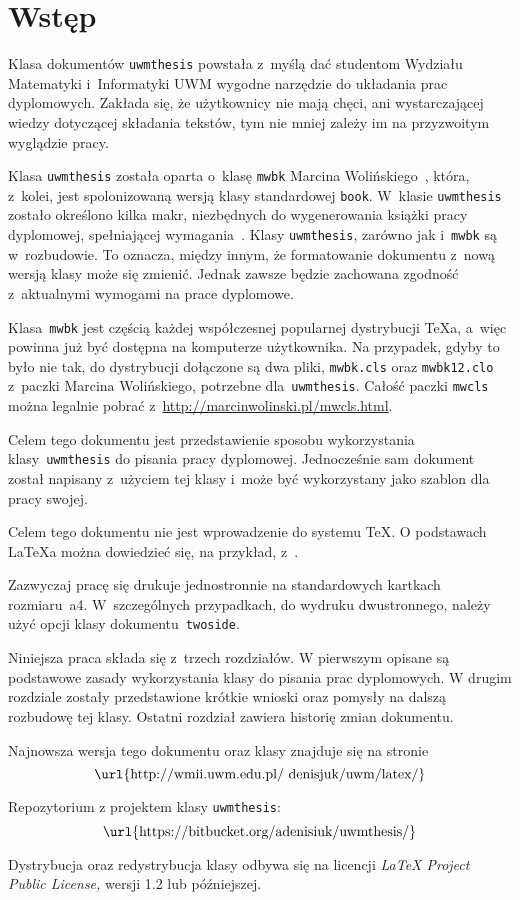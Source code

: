 
\chapter*{Wstęp}

Klasa dokumentów \texttt{uwmthesis} powstała z~myślą dać studentom Wydziału Matematyki i~Informatyki UWM wygodne narzędzie do układania prac dyplomowych. Zakłada się, że użytkownicy nie mają chęci, ani wystarczającej wiedzy dotyczącej składania tekstów, tym nie mniej zależy im na przyzwoitym wyglądzie pracy.


Klasa \texttt{uwmthesis} została oparta o~klasę \texttt{mwbk} Marcina Wolińskiego~\cite{Wolinski}, która, z~kolei, jest spolonizowaną wersją klasy standardowej \texttt{book}. W~klasie \texttt{uwmthesis} zostało określono kilka makr, niezbędnych do wygenerowania książki pracy dyplomowej, spełniającej wymagania~\cite{UWM}. Klasy \texttt{uwmthesis}, zarówno jak i~\texttt{mwbk} są w~rozbudowie. To oznacza, między innym, że formatowanie dokumentu z~nową wersją klasy może się zmienić. Jednak zawsze będzie zachowana zgodność z~aktualnymi wymogami na prace dyplomowe.

Klasa~\texttt{mwbk} jest częścią każdej współczesnej popularnej dystrybucji \TeX a, a~więc powinna już być dostępna na komputerze użytkownika. Na przypadek, gdyby to było nie tak, do dystrybucji dołączone są dwa pliki, \texttt{mwbk.cls} oraz \texttt{mwbk12.clo} z~paczki Marcina Wolińskiego, potrzebne dla~\texttt{uwmthesis}. Całość paczki \texttt{mwcls} można legalnie pobrać z~\url{http://marcinwolinski.pl/mwcls.html}.

Celem tego dokumentu jest przedstawienie sposobu wykorzystania klasy~\texttt{uwmthesis} do pisania pracy dyplomowej. Jednocześnie sam dokument został napisany z~użyciem tej klasy i~może być wykorzystany jako szablon dla pracy swojej.

Celem tego dokumentu nie jest wprowadzenie do systemu \TeX. O podstawach \LaTeX a można dowiedzieć się, na przykład, z~\cite{Oetker}.

Zazwyczaj pracę się drukuje jednostronnie na standardowych kartkach rozmiaru~a4. W~szczególnych przypadkach, do wydruku dwustronnego, należy użyć opcji klasy dokumentu~\texttt{twoside}.


Niniejsza praca składa się z~trzech rozdziałów. W pierwszym opisane są podstawowe zasady wykorzystania klasy do pisania prac dyplomowych. W drugim rozdziale zostały przedstawione krótkie wnioski oraz pomysły na dalszą rozbudowę tej klasy.
Ostatni rozdział zawiera historię zmian dokumentu.

Najnowsza wersja tego dokumentu oraz klasy znajduje się na stronie $$\hbox{\url{http://wmii.uwm.edu.pl/~denisjuk/uwm/latex/}}$$

Repozytorium z projektem klasy \texttt{uwmthesis}:
  $$\hbox{\url{https://bitbucket.org/adenisiuk/uwmthesis/}}$$

Dystrybucja oraz redystrybucja klasy odbywa się na licencji \emph{LaTeX Project Public License,} wersji 1.2 lub późniejszej.

